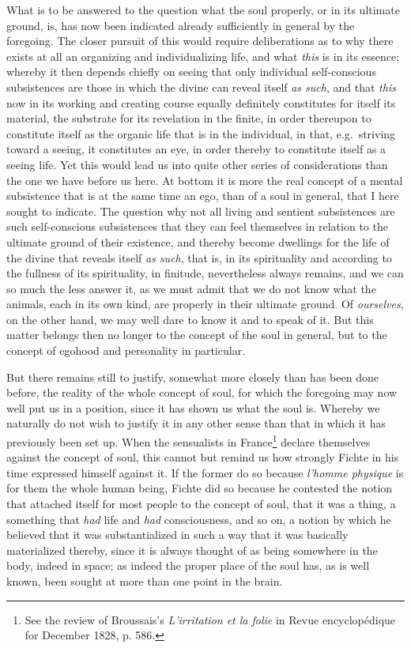 \documentclass[12pt,a4paper,openany]{book}
\newcommand{\opage}[1]{\marginnote{\footnotesize\textit{[#1]}}}
\begin{document}
What is to be answered to the question what the soul properly, or in its ultimate
ground, is, has now been indicated already sufficiently in general by the foregoing.
The
\setcounter{footnote}{0}%
\opage{124}closer pursuit of this would require deliberations as to why there exists at all
an organizing and individualizing life, and what \emph{this} is in its essence;
whereby it then depends chiefly on seeing that only individual self-conscious
subsistences are those in which the divine can reveal itself \emph{as such}, and that
\emph{this} now in its working and creating course equally definitely constitutes for
itself its material, the substrate for its revelation in the finite, in order
thereupon to constitute itself as the organic life that is in the individual, in that,
e.g.\ striving toward a seeing, it constitutes an eye, in order thereby to constitute
itself as a seeing life. Yet this would lead us into quite other series of
considerations than the one we have before us here. At bottom it is more the real
concept of a mental subsistence that is at the same time an ego, than of a soul in
general, that I here sought to indicate. The question why not all living and sentient
subsistences are such self-conscious subsistences that they can feel themselves in
relation to the ultimate ground of their existence, and thereby become dwellings for
the life of the divine that reveals itself \emph{as such}, that is, in its
spirituality and according to the fullness of its spirituality, in finitude,
nevertheless always remains, and we can so much the less answer it, as we must admit
that we do not know what the animals, each in its own kind, are properly in their
ultimate ground. Of \emph{ourselves}, on the other hand, we may well dare to know it
and to speak of it. But this matter belongs then no longer to the concept of the soul
in general, but to the concept of egohood and personality in particular.

But there remains still to justify, somewhat more closely than has been done before,
the reality of the whole concept of soul, for which the foregoing may now well put us
in a position, since it has shown us what the soul is. Whereby we naturally do not
wish to justify it in any other sense than that in which it has previously been set
up. When the sensualists in France\footnote[1]{See the review of Broussais's
\textit{L'irritation et la folie} in Revue encyclopédique for December 1828, p. 586.}
\setcounter{footnote}{0}%
\opage{125}declare themselves against the concept of soul, this cannot but remind us how
strongly Fichte in his time expressed himself against it. If the former do so because
\textit{l'homme physique} is for them the whole human being, Fichte did so because
he contested the notion that attached itself for most people to the concept of soul,
that it was a thing, a something that \emph{had} life and \emph{had} consciousness,
and so on, a notion by which he believed that it was substantialized in such a way
that it was basically materialized thereby, since it is always thought of as being
somewhere in the body, indeed in space; as indeed the proper place of the soul has,
as is well known, been sought at more than one point in the brain.
\end{document}
